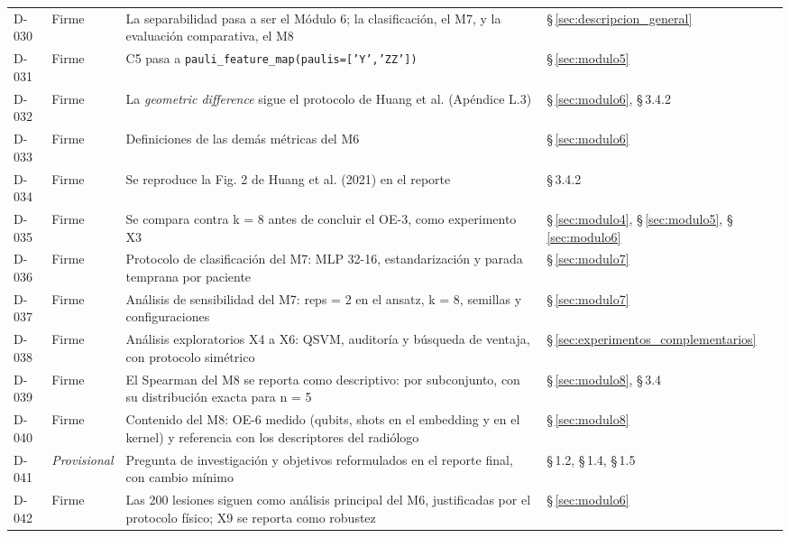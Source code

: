 \begin{longtable}{@{}llp{8.4cm}p{3.0cm}@{}}
D-030 & Firme & La separabilidad pasa a ser el Módulo 6; la clasificación, el M7, y la evaluación comparativa, el M8 & \S\,\ref{sec:descripcion_general} \\
D-031 & Firme & C5 pasa a \texttt{pauli\_feature\_map(paulis=['Y','ZZ'])} & \S\,\ref{sec:modulo5} \\
D-032 & Firme & La \textit{geometric difference} sigue el protocolo de Huang et al. (Apéndice L.3) & \S\,\ref{sec:modulo6}, \S\,3.4.2 \\
D-033 & Firme & Definiciones de las demás métricas del M6 & \S\,\ref{sec:modulo6} \\
D-034 & Firme & Se reproduce la Fig. 2 de Huang et al. (2021) en el reporte & \S\,3.4.2 \\
D-035 & Firme & Se compara contra k = 8 antes de concluir el OE-3, como experimento X3 & \S\,\ref{sec:modulo4}, \S\,\ref{sec:modulo5}, \S\,\ref{sec:modulo6} \\
D-036 & Firme & Protocolo de clasificación del M7: MLP 32-16, estandarización y parada temprana por paciente & \S\,\ref{sec:modulo7} \\
D-037 & Firme & Análisis de sensibilidad del M7: reps = 2 en el ansatz, k = 8, semillas y configuraciones & \S\,\ref{sec:modulo7} \\
D-038 & Firme & Análisis exploratorios X4 a X6: QSVM, auditoría y búsqueda de ventaja, con protocolo simétrico & \S\,\ref{sec:experimentos_complementarios} \\
D-039 & Firme & El Spearman del M8 se reporta como descriptivo: por subconjunto, con su distribución exacta para n = 5 & \S\,\ref{sec:modulo8}, \S\,3.4 \\
D-040 & Firme & Contenido del M8: OE-6 medido (qubits, shots en el embedding y en el kernel) y referencia con los descriptores del radiólogo & \S\,\ref{sec:modulo8} \\
D-041 & \textit{Provisional} & Pregunta de investigación y objetivos reformulados en el reporte final, con cambio mínimo & \S\,1.2, \S\,1.4, \S\,1.5 \\
D-042 & Firme & Las 200 lesiones siguen como análisis principal del M6, justificadas por el protocolo físico; X9 se reporta como robustez & \S\,\ref{sec:modulo6} \\
\end{longtable}
